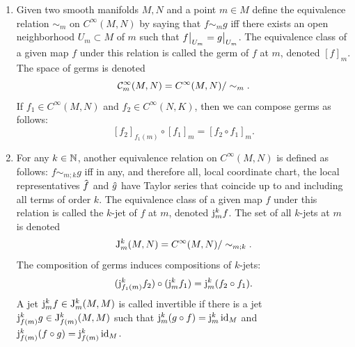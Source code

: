 \begin{defn}\label{def jet bundles}
    \begin{enumerate}
        \item Given two smooth manifolds $M,N$ and a point $m\in M$ define the equivalence relation $\sim_m$ on $C^\infty(M,N)$ by saying that $f\sim_m g$ iff there exists an open neighborhood $U_m\subset M$ of $m$ such that $\restr{f}{U_m}=\restr{g}{U_m}$. The equivalence class of a given map $f$ under this relation is called the germ of $f$ at $m$, denoted $[f]_m$. The space of germs is denoted
        \[\mathcal{C}^\infty_m(M,N)=C^\infty(M,N)\slash \sim_m.\]
        If $f_1\in C^\infty(M,N)$ and $f_2\in C^\infty(N,K)$, then we can compose germs as follows:
        \[[f_2]_{f_1(m)}\circ [f_1]_{m}=[f_2\circ f_1]_m.\]
        \item For any $k\in\mathbb{N}$, another equivalence relation on $C^\infty(M,N)$ is defined as follows: $f\sim_{m;k}g$ iff in any, and therefore all, local coordinate chart, the local representatives $\wh{f}$ and $\wh{g}$ have Taylor series that coincide up to and including all terms of order $k$. The equivalence class of a given map $f$ under this relation is called the $k$-jet of $f$ at $m$, denoted $\mathrm{j}_m^k f$. The set of all $k$-jets at $m$ is denoted
        \[\mathrm{J}_m^k(M,N)=C^\infty (M,N)\slash \sim_{m;k}.\]
        The composition of germs induces compositions of $k$-jets:
        \[(\mathrm{j}_{f_1(m)}^kf_2)\circ (\mathrm{j}_m^k f_1)=\mathrm{j}_m^k(f_2\circ f_1).\]
        A jet $\mathrm{j}_m^kf\in \mathrm{J}^k_m(M,M)$ is called invertible if there is a jet $\mathrm{j}^k_{f(m)}g\in \mathrm{J}^k_{f(m)}(M,M)$ such that $\mathrm{j}^k_m(g\circ f)=\mathrm{j}^k_m\operatorname{id}_M$ and $\mathrm{j}^k_{f(m)}(f\circ g)=\mathrm{j}^k_{f(m)}\operatorname{id}_M$. 
        

\end{enumerate}
\end{defn}

